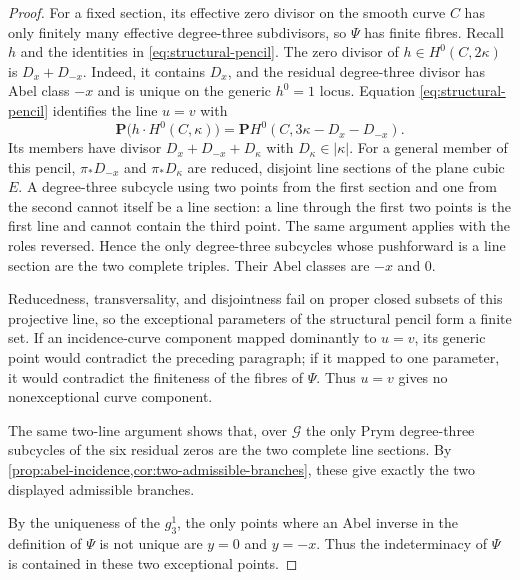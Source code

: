 \documentclass[10pt]{amsart}
\numberwithin{equation}{section}
\theoremstyle{definition}
\theoremstyle{remark}
\newcommand{\PP}{\mathbf P}
\begin{document}
\begin{proof}
For a fixed section, its effective zero divisor on the smooth curve $C$ has
only finitely many effective degree-three subdivisors, so $\Psi$ has finite
fibres.  Recall $h$ and the identities in
\eqref{eq:structural-pencil}.
The zero divisor of $h\in H^0(C,2\kappa)$ is
$D_x+D_{-x}$.  Indeed, it contains $D_x$, and the residual degree-three
divisor has Abel class $-x$ and is unique on the generic $h^0=1$ locus.
Equation \eqref{eq:structural-pencil} identifies the line $u=v$ with
\[
 \PP\bigl(h\cdot H^0(C,\kappa)\bigr)
 =\PP H^0(C,3\kappa-D_x-D_{-x}).
\]
 Its members have divisor $D_x+D_{-x}+D_\kappa$ with
 $D_\kappa\in|\kappa|$.  For a general member of this pencil,
 $\pi_*D_{-x}$ and $\pi_*D_\kappa$ are reduced, disjoint line sections of the
 plane cubic $E$.  A
 degree-three subcycle using two points from the first section and one from
 the second cannot itself be a line section: a line through the first two
 points is the first line and cannot contain the third point.  The same
 argument applies with the roles reversed.  Hence the only degree-three
 subcycles whose pushforward is a line section are the two complete triples.
 Their Abel classes are $-x$ and $0$.

 Reducedness, transversality, and disjointness fail on proper closed subsets
 of this projective line, so the exceptional parameters of the structural
 pencil form a finite set.  If
 an incidence-curve component mapped dominantly to $u=v$, its generic point
 would contradict the preceding paragraph; if it mapped to one parameter, it
 would contradict the finiteness of the fibres of $\Psi$.  Thus $u=v$ gives no
 nonexceptional curve component.

 The same two-line argument shows that, over
 $\mathscr G$ the only Prym degree-three subcycles of the six residual zeros
are the two complete line sections.  By
\cref{prop:abel-incidence,cor:two-admissible-branches}, these give exactly
the two displayed admissible branches.

By the uniqueness of the $g^1_3$, the only points where an Abel inverse in
the definition of $\Psi$ is not unique are $y=0$ and $y=-x$.  Thus the
indeterminacy of $\Psi$ is contained in these two exceptional points.


\end{proof}
\end{document}
